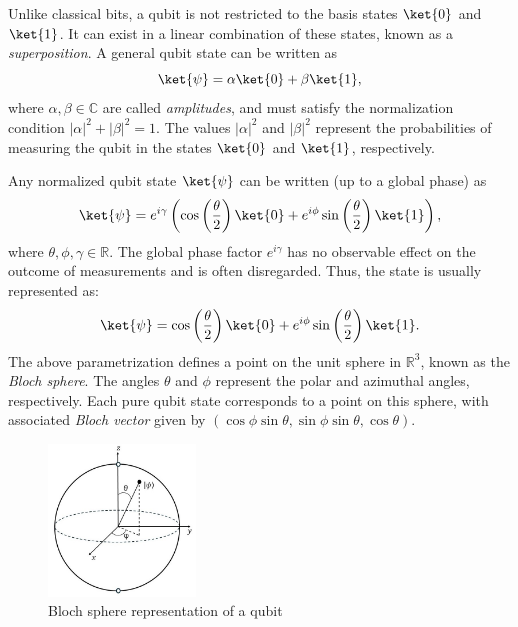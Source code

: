 \begin{definition}
  Unlike classical bits, a qubit is not restricted to the basis states \( \ket{0} \) and \( \ket{1} \). It can exist in a linear combination of these states, known as a \emph{superposition}. A general qubit state can be written as
  \[
  \ket{\psi} = \alpha \ket{0} + \beta \ket{1},
  \]
  where \( \alpha, \beta \in \mathbb{C} \) are called \emph{amplitudes}, and must satisfy the normalization condition \( |\alpha|^2 + |\beta|^2 = 1 \). The values \( |\alpha|^2 \) and \( |\beta|^2 \) represent the probabilities of measuring the qubit in the states \( \ket{0} \) and \( \ket{1} \), respectively.
\end{definition}


  Any normalized qubit state \( \ket{\psi} \) can be written (up to a global phase) as
  \[
  \ket{\psi} = e^{i \gamma} \left(\cos\left(\frac{\theta}{2}\right) \ket{0} + e^{i\phi}\sin\left(\frac{\theta}{2}\right)\ket{1}\right),
  \]
  where \( \theta, \phi, \gamma \in \mathbb{R} \). The global phase factor \( e^{i \gamma} \) has no observable effect on the outcome of measurements and is often disregarded. Thus, the state is usually represented as:
  \begin{equation} \label{eq:qubit3}
  \ket{\psi} = \cos\left(\frac{\theta}{2}\right) \ket{0} + e^{i\phi}\sin\left(\frac{\theta}{2}\right)\ket{1}.
  \end{equation}
  The above parametrization defines a point on the unit sphere in \( \mathbb{R}^3 \), known as the \emph{Bloch sphere}. The angles \( \theta \) and \( \phi \) represent the polar and azimuthal angles, respectively. Each pure qubit state corresponds to a point on this sphere, with associated \emph{Bloch vector} given by
  $(\cos \phi \sin \theta, \sin \phi \sin \theta, \cos \theta).$

 
\begin{figure}[H] 
  \centering
  \includegraphics[width=0.35\textwidth]{images/bloch_sphere.jpg}
  \caption{Bloch sphere representation of a qubit}
  \label{fig:bloch_sphere}
\end{figure}

